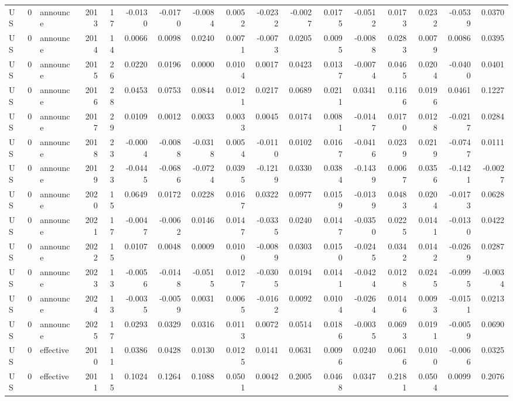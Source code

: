 \begin{tabular}{lrlrrrrrrrrrrrrrr}
US & 0 & announce & 2013 & 17 & -0.0130 & -0.0170 & -0.0084 & 0.0052 & -0.0232 & -0.0027 & 0.0175 & -0.0512 & 0.0173 & 0.0232 & -0.0539 & 0.0370 \\
US & 0 & announce & 2014 & 14 & 0.0066 & 0.0098 & 0.0240 & 0.0071 & -0.0073 & 0.0205 & 0.0095 & -0.0088 & 0.0283 & 0.0079 & 0.0086 & 0.0395 \\
US & 0 & announce & 2015 & 26 & 0.0220 & 0.0196 & 0.0000 & 0.0104 & 0.0017 & 0.0423 & 0.0137 & -0.0074 & 0.0465 & 0.0204 & -0.0400 & 0.0401 \\
US & 0 & announce & 2016 & 28 & 0.0453 & 0.0753 & 0.0844 & 0.0121 & 0.0217 & 0.0689 & 0.0211 & 0.0341 & 0.1166 & 0.0196 & 0.0461 & 0.1227 \\
US & 0 & announce & 2017 & 29 & 0.0109 & 0.0012 & 0.0033 & 0.0033 & 0.0045 & 0.0174 & 0.0081 & -0.0147 & 0.0170 & 0.0128 & -0.0217 & 0.0284 \\
US & 0 & announce & 2018 & 23 & -0.0004 & -0.0088 & -0.0318 & 0.0054 & -0.0110 & 0.0102 & 0.0167 & -0.0416 & 0.0239 & 0.0219 & -0.0747 & 0.0111 \\
US & 0 & announce & 2019 & 23 & -0.0445 & -0.0686 & -0.0724 & 0.0395 & -0.1219 & 0.0330 & 0.0384 & -0.1439 & 0.0067 & 0.0356 & -0.1421 & -0.0027 \\
US & 0 & announce & 2020 & 15 & 0.0649 & 0.0172 & 0.0228 & 0.0167 & 0.0322 & 0.0977 & 0.0159 & -0.0139 & 0.0483 & 0.0204 & -0.0173 & 0.0628 \\
US & 0 & announce & 2021 & 17 & -0.0047 & -0.0062 & 0.0146 & 0.0147 & -0.0335 & 0.0240 & 0.0147 & -0.0350 & 0.0225 & 0.0141 & -0.0130 & 0.0422 \\
US & 0 & announce & 2022 & 15 & 0.0107 & 0.0048 & 0.0009 & 0.0100 & -0.0089 & 0.0303 & 0.0150 & -0.0245 & 0.0342 & 0.0142 & -0.0269 & 0.0287 \\
US & 0 & announce & 2023 & 13 & -0.0056 & -0.0148 & -0.0515 & 0.0127 & -0.0305 & 0.0194 & 0.0141 & -0.0424 & 0.0128 & 0.0245 & -0.0995 & -0.0034 \\
US & 0 & announce & 2024 & 13 & -0.0035 & -0.0059 & 0.0031 & 0.0065 & -0.0162 & 0.0092 & 0.0104 & -0.0264 & 0.0146 & 0.0093 & -0.0151 & 0.0213 \\
US & 0 & announce & 2025 & 17 & 0.0293 & 0.0329 & 0.0316 & 0.0113 & 0.0072 & 0.0514 & 0.0186 & -0.0035 & 0.0693 & 0.0191 & -0.0059 & 0.0690 \\
US & 0 & effective & 2010 & 11 & 0.0386 & 0.0428 & 0.0130 & 0.0125 & 0.0141 & 0.0631 & 0.0096 & 0.0240 & 0.0616 & 0.0100 & -0.0066 & 0.0325 \\
US & 0 & effective & 2011 & 15 & 0.1024 & 0.1264 & 0.1088 & 0.0501 & 0.0042 & 0.2005 & 0.0468 & 0.0347 & 0.2181 & 0.0504 & 0.0099 & 0.2076 \\

\end{tabular}
